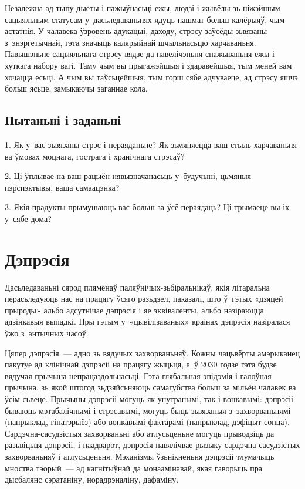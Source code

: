 Незалежна ад тыпу дыеты і пажыўнасьці ежы, людзі і жывёлы зь ніжэйшым сацыяльным статусам у~дасьледаваньнях ядуць нашмат больш калёрыяў, чым астатнія. У чалавека ўзровень адукацыі, даходу, стрэсу заўсёды зьвязаны з~энэргетычнай, гэта значыць калярыйнай шчыльнасьцю харчаваньня. Павышэньне сацыяльнага стрэсу вядзе да павелічэньня спажываньня ежы і хуткага набору вагі. Таму чым вы прыгажэйшыя і здаравейшыя, тым меней вам хочацца есьці. А чым вы таўсьцейшыя, тым горш сябе адчуваеце, ад стрэсу яшчэ больш ясьце, замыкаючы заганнае кола.

\subsection*{Пытаньні і заданьні}

1. Як у~вас зьвязаны стрэс і пераяданьне? Як зьмяняецца ваш стыль харчаваньня ва ўмовах моцнага, гострага і хранічнага стрэсаў?

2. Ці ўплывае на ваш рацыён нявызначанасьць у~будучыні, цьмяныя пэрспэктывы, ваша самаацэнка?

3. Якія прадукты прымушаюць вас больш за ўсё пераядаць? Ці трымаеце вы іх у~сябе дома?


\section{Дэпрэсія}

Дасьледаваньні сярод плямёнаў паляўнічых-зьбіральнікаў, якія літаральна перасьледуюць нас на працягу ўсяго разьдзел, паказалі, што ў~гэтых «дзяцей прыроды» альбо адсутнічае дэпрэсія і яе эквіваленты, альбо назіраюцца адзінкавыя выпадкі. Пры гэтым у~«цывілізаваных» краінах дэпрэсія назіралася ўжо з~антычных часоў. 


Цяпер дэпрэсія~--- адно зь вядучых захворваньняў. Кожны чацьвёрты амэрыканец пакутуе ад клінічнай дэпрэсіі на працягу жыцьця, а~ў 2030 годзе гэта будзе вядучая прычына непрацаздольнасьці. Гэта глябальная эпідэмія і галоўная прычына, зь якой штогод зьдзяйсьняюць самагубства больш за мільён чалавек ва ўсім сьвеце. Прычыны дэпрэсіі могуць як унутранымі, так і вонкавымі: дэпрэсіі бываюць мэтабалічнымі і стрэсавымі, могуць быць зьвязаныя з~захворваньнямі (напрыклад, гіпатэрыёз) або вонкавымі фактарамі (напрыклад, дэфіцыт сонца). Сардэчна-сасудзістыя захворваньні або атлусьценьне могуць прыводзіць да разьвіцьця дэпрэсіі, і наадварот, дэпрэсія павялічвае рызыку сардэчна-сасудзістых захворваньняў і атлусьценьня. Мэханізмы ўзьнікненьня дэпрэсіі тлумачыць мноства тэорый~--- ад кагнітыўнай да монаамінавай, якая гаворыць пра дысбалянс сэратаніну, норадрэналіну, дафаміну.

